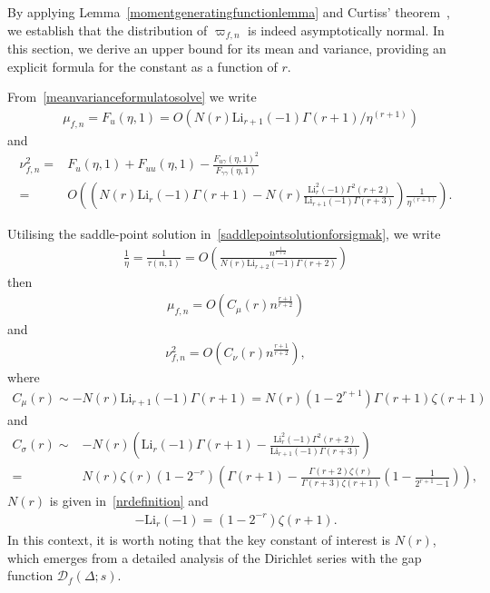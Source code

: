 \documentclass[12pt, oneside,reqno]{amsart}
\numberwithin{equation}{section}
\begin{document}
By applying Lemma~\ref{momentgeneratingfunctionlemma} and Curtiss' theorem~\cite{curtiss}, we establish that the distribution of ${\varpi}_{f,n}$ is indeed asymptotically normal. In this section, we derive an upper bound for its mean and variance, providing an explicit formula for the constant as a function of $r$.

\medskip

From~\eqref{meanvarianceformulatosolve} we write
\begin{align*}
&\mu_{f,n}
=F_{u}(\eta,1)
=O\left(N(r)\mathrm{Li}_{r+1}(-1)\Gamma(r+1)/\eta^{(r+1)}\right)
\end{align*}
and 
\begin{align*}
\nu^2_{f,n}
=&F_{u}(\eta,1)+F_{uu}(\eta,1)-\frac{F_{u\gamma}(\eta,1)^2}{F_{\gamma\gamma}(\eta,1)}\\
=& O\left(\left(N(r)\mathrm{Li}_{r}(-1)\Gamma(r+1)-N(r)\frac{\mathrm{Li}^2_{r}(-1)\Gamma^2(r+2)}{\mathrm{Li}_{r+1}(-1)\Gamma(r+3)}\right)\frac{1}{\eta^{(r+1)}}\right).
\end{align*}

\noindent
Utilising the saddle-point solution in~\eqref{saddlepointsolutionforsigmak}, we write
\begin{align*}
\frac{1}{\eta}
=\frac{1}{\tau(n,1)}
=O\left(\frac{n^{\frac{1}{r+2}}}{{N(r)\mathrm{Li}_{r+2}(-1)\Gamma(r+2)}}\right)
\end{align*}
then 
\begin{align*}
\mu_{f,n}
=O\left(C_{\mu}(r)n^{\frac{r+1}{r+2}}\right)
\end{align*}
and
\begin{align*}
\nu^2_{f,n}
=O\left(C_{\nu}(r)n^{\frac{r+1}{r+2}}\right),
\end{align*}
where 
\begin{align}\label{meanconstant}
C_{\mu}(r)
\sim -N(r){\mathrm{Li}_{r+1}(-1)\Gamma(r+1)}%
=N(r)(1-2^{r+1})\Gamma(r+1)\zeta(r+1)
\end{align}
and 
\begin{align}\label{varianceconstant}
C_{\sigma}(r)
\sim& -N(r)\left({\mathrm{Li}_{r}(-1)\Gamma(r+1)-\frac{\mathrm{Li}^2_{r}(-1)\Gamma^2(r+2)}{\mathrm{Li}_{r+1}(-1)\Gamma(r+3)}}\right)\nonumber\\%
=&N(r)\zeta(r)(1-2^{-r})\left(\Gamma(r+1)-\frac{\Gamma(r+2)\zeta(r)}{\Gamma(r+3)\zeta(r+1)}\left(1-\frac{1}{2^{r+1}-1}\right)\right),
\end{align}
$N(r)$ is given in~\eqref{nrdefinition} and
\begin{align*}
-\mathrm{Li}_{r}(-1)
=(1-2^{-r})\zeta(r+1).
\end{align*}
\noindent
In this context, it is worth noting that the key constant of interest is $N(r)$, which emerges from a detailed analysis of the Dirichlet series with the gap function $\mathcal{D}_f(\Delta;s)$.
\end{document}
